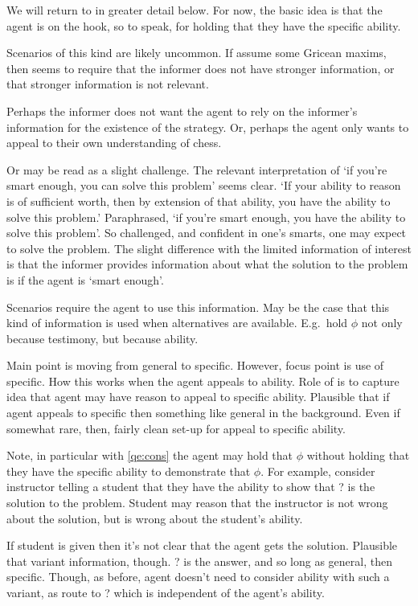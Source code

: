 \begin{note}
  We will return to \GSI{} in greater detail below.
  For now, the basic idea is that the agent is on the hook, so to speak, for holding that they have the specific ability.

  Scenarios of this kind are likely uncommon.
  If assume some Gricean maxims, then seems to require that the informer does not have stronger information, or that stronger information is not relevant.

  Perhaps the informer does not want the agent to rely on the informer's information for the existence of the strategy.
  Or, perhaps the agent only wants to appeal to their own understanding of chess.

  Or may be read as a slight challenge.
  The relevant interpretation of `if you're smart enough, you can solve this problem' seems clear.
  `If your ability to reason is of sufficient worth, then by extension of that ability, you have the ability to solve this problem.'
  Paraphrased, `if you're smart enough, you have the ability to solve this problem'.
  So challenged, and confident in one's smarts, one may expect to solve the problem.
  The slight difference with the limited information of interest is that the informer provides information about what the solution to the problem is if the agent is `smart enough'.

  Scenarios require the agent to use this information.
  May be the case that this kind of information is used when alternatives are available.
  E.g.\ hold \(\phi\) not only because testimony, but because ability.

  Main point is moving from general to specific.
  However, focus point is use of specific.
  How this works when the agent appeals to ability.
  Role of \GSI{} is to capture idea that agent may have reason to appeal to specific ability.
  Plausible that if agent appeals to specific then something like general in the background.
  Even if somewhat rare, then, fairly clean set-up for appeal to specific ability.

  Note, in particular with \ref{qe:cons} the agent may hold that \(\phi\) without holding that they have the specific ability to demonstrate that \(\phi\).
  For example, consider instructor telling a student that they have the ability to show that ? is the solution to the problem.
  Student may reason that the instructor is not wrong about the solution, but is wrong about the student's ability.

  If student is given \GSI{} then it's not clear that the agent gets the solution.
  Plausible that variant information, though.
  ? is the answer, and so long as general, then specific.
  Though, as before, agent doesn't need to consider ability with such a variant, as route to ? which is independent of the agent's ability.
\end{note}

